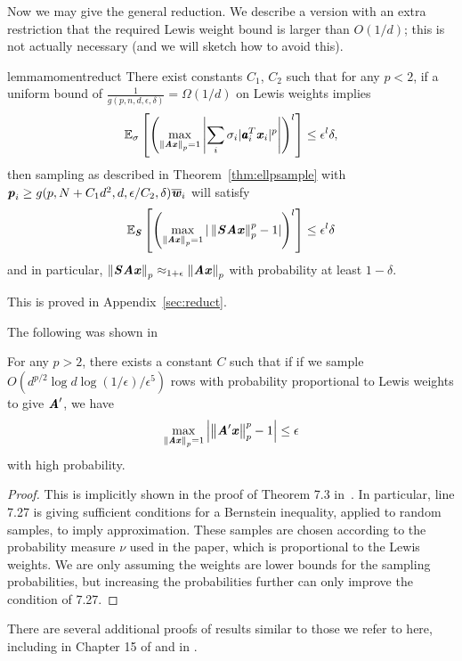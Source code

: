 Now we may give the general reduction.  We describe a version with an extra
restriction that the required Lewis weight bound is larger than $O(1/d)$;
this is not actually necessary (and we will sketch how to avoid this).
\begin{restatable}{lemma}{momentreduct}
\label{lem:momentreduct}
There exist constants $C_1$, $C_2$ such that for any $p < 2$, if a uniform bound of $\frac{1}{g(p, n, d, \epsilon, \delta)} = \Omega(1/d)$ on
Lewis weights implies
\begin{equation*}
\expec{\sigma}{\left (\max_{\norm{\AA \xx}_p = 1} \left | \sum_i \sigma_i |\aa_i^T \xx_i|^p \right | \right )^l} \leq \epsilon^l \delta,
\end{equation*}
then sampling as described in Theorem~\ref{thm:ellpsample} with $\pp_i \geq g(p, N + C_1 d^2, d, \epsilon / C_2, \delta) \wwbar_i$ will satisfy
\begin{equation*}
\expec{\SS}{\left ( \max_{\norm{\AA \xx}_p = 1} | \norm{\SS \AA \xx}_p^p - 1 | \right )^l} \leq \epsilon^l \delta
\end{equation*}
and in particular, $\norm{\SS \AA \xx}_p \approx_{1 + \epsilon} \norm{\AA \xx}_p$ with probability at least $1-\delta$.
\end{restatable}
This is proved in Appendix~\ref{sec:reduct}.

The following was shown in~\cite{BourgainLM89}
\begin{lemma}
For any $p > 2$, there exists a constant $C$ such that if
if we sample $O(d^{p / 2} \log d \log(1 / \epsilon) / \epsilon^5)$ rows
with probability proportional to Lewis weights to give $\AA'$, we have
\begin{equation*}
\max_{\norm{\AA \xx}_p = 1}
\left | \norm{\AA' \xx}_p^p - 1 \right |  \leq \epsilon
\end{equation*}
with high probability.
\end{lemma}

\begin{proof}
This is implicitly shown in the proof of Theorem 7.3 in~\cite{BourgainLM89}.  In particular, line
7.27 is giving sufficient conditions for a Bernstein inequality, applied to random samples,
to imply approximation.  These samples are chosen according to the probability measure $\nu$
used in the paper, which is proportional to the Lewis weights.  We are only assuming the weights
are lower bounds for the sampling probabilities, but increasing the probabilities further can
only improve the condition of 7.27.
\end{proof}

There are several additional proofs of results similar to those we refer to here, including in Chapter 15 of
\cite{LedouxTBook} and in \cite{GuedonR07}.
